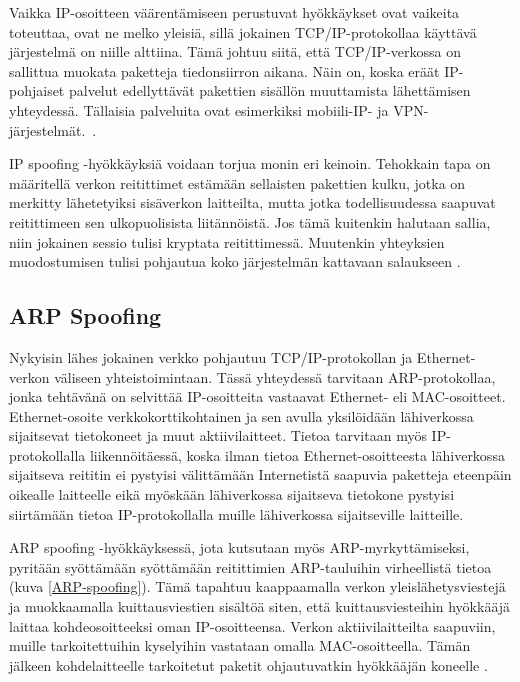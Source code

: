 Vaikka IP-osoitteen väärentämiseen perustuvat hyökkäykset ovat
vaikeita toteuttaa, ovat ne melko yleisiä, sillä jokainen
TCP/IP-protokollaa käyttävä järjestelmä on niille alttiina. Tämä
johtuu siitä, että TCP/IP-verkossa on sallittua muokata paketteja
tiedonsiirron aikana. Näin on, koska eräät IP-pohjaiset palvelut
edellyttävät pakettien sisällön muuttamista lähettämisen
yhteydessä. Tällaisia palveluita ovat esimerkiksi mobiili-IP- ja
VPN-järjestelmät.~\cite{DDOS}.

IP spoofing -hyökkäyksiä voidaan torjua monin eri keinoin. Tehokkain
tapa on määritellä verkon reitittimet estämään sellaisten pakettien
kulku, jotka on merkitty lähetetyiksi sisäverkon laitteilta, mutta
jotka todellisuudessa saapuvat reitittimeen sen ulkopuolisista
liitännöistä. Jos tämä kuitenkin halutaan sallia, niin jokainen sessio
tulisi kryptata reitittimessä. Muutenkin yhteyksien muodostumisen
tulisi pohjautua koko järjestelmän kattavaan salaukseen \cite{WEBS}.


\subsection{ARP Spoofing}

Nykyisin lähes jokainen verkko pohjautuu TCP/IP-protokollan ja
Ethernet-verkon väliseen yhteistoimintaan. Tässä yhteydessä tarvitaan
ARP-pro\-to\-kol\-laa, jonka tehtävänä on selvittää IP-osoitteita
vastaavat Ethernet- eli MAC-osoitteet. Ethernet-osoite
verkkokorttikohtainen ja sen avulla yksilöidään lähiverkossa
sijaitsevat tietokoneet ja muut aktiivilaitteet.  Tietoa tarvitaan
myös IP-protokollalla liikennöitäessä, koska ilman tietoa
Ethernet-osoitteesta lähiverkossa sijaitseva reititin ei pystyisi
välittämään Internetistä saapuvia paketteja eteenpäin oikealle
laitteelle eikä myöskään lähiverkossa sijaitseva tietokone pystyisi
siirtämään tietoa IP-protokollalla muille lähiverkossa sijaitseville
laitteille.

ARP spoofing -hyökkäyksessä, jota kutsutaan myös ARP-myrkyttämiseksi,
pyritään syöttämään syöttämään reitittimien ARP-tauluihin virheellistä
tietoa (kuva \ref{ARP-spoofing}). Tämä tapahtuu kaappaamalla verkon
yleislähetysviestejä ja muokkaamalla kuittausviestien sisältöä siten,
että kuittausviesteihin hyökkääjä laittaa kohdeosoitteeksi oman
IP-osoitteensa. Verkon aktiivilaitteilta saapuviin, muille
tarkoitettuihin kyselyihin vastataan omalla MAC-osoitteella.  Tämän
jälkeen kohdelaitteelle tarkoitetut paketit ohjautuvatkin hyökkääjän
koneelle \cite{WEBS}.

